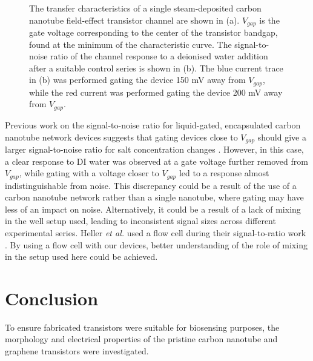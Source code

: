 \documentclass[
  a4paper,
]{scrbook}
\begin{document}
\begin{figure}
\begin{minipage}[t]{0.55\linewidth}
{}

\end{minipage}%

\caption[Figure demonstrating change in signal-to-noise ratio resulting
from adjusting gate voltage.]{\label{fig-salt-conc-SNR}The transfer
characteristics of a single steam-deposited carbon nanotube field-effect
transistor channel are shown in (a). \(V_{gap}\) is the gate voltage
corresponding to the center of the transistor bandgap, found at the
minimum of the characteristic curve. The signal-to-noise ratio of the
channel response to a deionised water addition after a suitable control
series is shown in (b). The blue current trace in (b) was performed
gating the device 150 mV away from \(V_{gap}\), while the red current
was performed gating the device 200 mV away from \(V_{gap}\).}

\end{figure}

Previous work on the signal-to-noise ratio for liquid-gated,
encapsulated carbon nanotube network devices suggests that gating
devices close to \(V_{gap}\) should give a larger signal-to-noise ratio
for salt concentration changes \autocite{Heller2009}. However, in this
case, a clear response to DI water was observed at a gate voltage
further removed from \(V_{gap}\), while gating with a voltage closer to
\(V_{gap}\) led to a response almost indistinguishable from noise. This
discrepancy could be a result of the use of a carbon nanotube network
rather than a single nanotube, where gating may have less of an impact
on noise. Alternatively, it could be a result of a lack of mixing in the
well setup used, leading to inconsistent signal sizes across different
experimental series. Heller \emph{et al.} used a flow cell during their
signal-to-ratio work \autocite{Heller2009}. By using a flow cell with
our devices, better understanding of the role of mixing in the setup
used here could be achieved.

\hypertarget{conclusion}{%
\section{Conclusion}\label{conclusion}}

To ensure fabricated transistors were suitable for biosensing purposes,
the morphology and electrical properties of the pristine carbon nanotube
and graphene transistors were investigated.
\end{document}
